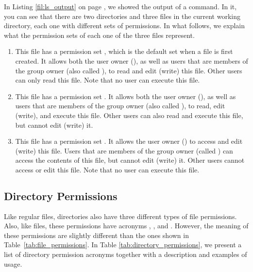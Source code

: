 In Listing \ref{fil:ls_output} on page \pageref{fil:ls_output}, we showed  the output of a  command. In it, you can see that there are two directories and three files in the current working directory, each one with different sets of permissions. In what follows, we explain what the permission sets of each one of the three files represent.


\begin{enumerate}
\item[\mycommand{read\_me}] This file has a permission set , which is the default set when a file is first created. It allows both the user owner (), as well as users that are members of the group owner (also called ), to read and edit (write) this file. Other users can only read this file. Note that no user can execute this file.
\item[\mycommand{script.sh}] This file has a permission set . It allows both the user owner (), as well as users that are members of the group owner (also called ), to read, edit (write), and execute this file. Other users can also read and execute this file, but cannot edit (write) it.
\item[\mycommand{config.pdf}] This file has a permission set . It allows the user owner () to access and edit (write) this file. Users that are members of the group owner (called ) can access the contents of this file, but cannot edit (write) it. Other users cannot access or edit this file. Note that no user can execute this file.
\end{enumerate}


\subsection{Directory Permissions}

Like regular files, directories also have three different types of file permissions. Also, like files, these permissions have acronyms , , and . However, the meaning of these permissions are slightly different than the ones shown in Table~\ref{tab:file_permissions}. In Table \ref{tab:directory_permissions}, we present a list of directory permission acronyms together with a description and examples of usage. 

